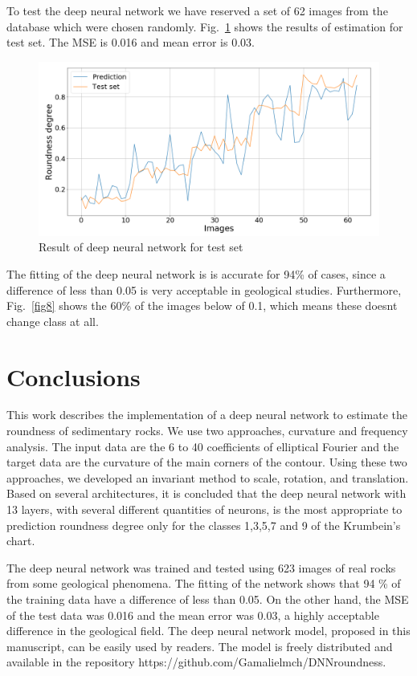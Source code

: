 \documentclass[conference]{IEEEtran}
\begin{document}
To test the deep neural network we have reserved a set of 62 images from the database which were chosen randomly. Fig.~\ref{fig9} shows the results of estimation for test set. The MSE is 0.016 and mean error is 0.03.

\begin{figure}[htbp]
	\centerline{\includegraphics[scale=0.3]{fig9.png}}
	\caption{Result of deep neural network for test set}
	\label{fig9}
\end{figure}

The fitting of the deep neural network is  is accurate for 94\% of cases, since a difference of less than 0.05 is very acceptable in geological studies. Furthermore, Fig.~\ref{fig8} shows the 60\% of the images below of 0.1, which means these doesnt change class at all.

\section{Conclusions}
This work describes the implementation of a deep neural network to estimate the roundness of sedimentary rocks. We use two approaches, curvature and frequency analysis. The input data are the 6 to 40 coefficients of elliptical Fourier and the target data are the curvature of the main corners of the contour. Using these two approaches, we developed an invariant method to scale, rotation, and translation. Based on several architectures, it is concluded that the deep neural network with 13 layers, with several different quantities of neurons, is the most appropriate to prediction roundness degree only for the classes 1,3,5,7 and 9 of the Krumbein's chart. 

The deep neural network was trained and tested using 623 images of real rocks from some geological phenomena. The fitting of the network shows that 94 \% of the training data have a difference of less than 0.05. On the other hand, the MSE of the test data was 0.016 and the mean error was 0.03, a highly acceptable difference in the geological field. The deep neural network model, proposed in this manuscript, can be easily used by readers. The model is freely distributed and available in the repository https://github.com/Gamalielmch/DNN\textunderscore roundness.
\end{document}
